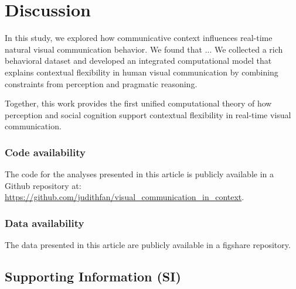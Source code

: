 \documentclass[9pt,twocolumn,twoside]{pnas-new}
\begin{document}
\section*{Discussion}

In this study, we explored how communicative context influences real-time natural visual communication behavior. We found that ... We collected a rich behavioral dataset and developed an integrated computational model that explains contextual flexibility in human visual communication by combining constraints from perception and pragmatic reasoning.








Together, this work provides the first unified computational theory of how perception and social cognition support contextual flexibility in real-time visual communication.

\subsubsection*{Code availability} The code for the analyses presented in this article is publicly available in a Github repository at: \url{https://github.com/judithfan/visual_communication_in_context}.

\subsubsection*{Data availability} The data presented in this article are publicly available in a figshare repository.

\subsection*{Supporting Information (SI)}

\end{document}
